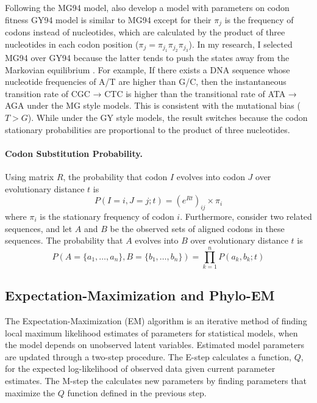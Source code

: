 Following the MG94 model, \cite{goldman1994codon} also develop a model with parameters on codon fitness GY94 model is similar to MG94 except for their $\pi_j$ is the frequency of codons instead of nucleotides, which are calculated by the product of three nucleotides in each codon position ($\pi_j = \pi_{j_1}\pi_{j_2}\pi_{j_3}$). In my research, I selected MG94 over GY94 because the latter tends to push the states away from the Markovian equilibrium \parencite{rodrigue2008bayesian}. For example, If there exists a DNA sequence whose nucleotide frequencies of A/T are higher than G/C, then the instantaneous transition rate of CGC → CTC is higher than the transitional rate of ATA → AGA under the MG style models. This is consistent with the mutational bias ($T>G$). While under the GY style models, the result switches because the codon stationary probabilities are proportional to the product of three nucleotides.

\paragraph{Codon Substitution Probability.} Using matrix $R$, the probability that codon $I$ evolves into codon $J$ over evolutionary distance $t$ is
%
\begin{equation} 
P\left(I = i, J = j ; t \right) = \left(e^{Rt}\right)_{ij} \times \pi_{i} 
\end{equation}
%
where $\pi_i$ is the stationary frequency of codon $i$. Furthermore, consider two related sequences, and let $A$ and $B$ be the observed sets of aligned codons in these sequences. The probability that $A$ evolves into $B$ over evolutionary distance $t$ is
%
\begin{equation}
    P\left(A = \{a_1, \ldots, a_n \}, B = \{b_1, \ldots, b_n \} \right) = \prod_{k=1}^{n} P(a_k, b_k ; t) 
\end{equation}
%


\subsection{Expectation-Maximization and Phylo-EM}
The Expectation-Maximization (EM) algorithm is an iterative method of finding local maximum likelihood estimates of parameters for statistical models, when the model depends on unobserved latent variables. Estimated model parameters are updated through a two-step procedure. The E-step calculates a function, $Q$, for the expected log-likelihood of observed data given current parameter estimates. The M-step the calculates new parameters by finding parameters that maximize the $Q$ function defined in the previous step.
